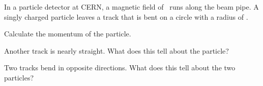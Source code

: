 In a particle detector at CERN, a magnetic field of \BO\ runs along the beam pipe. A singly charged particle leaves a track that is bent on a circle with a radius of \rO.

\begin{abcliste}
\abc Calculate the momentum of the particle.

\abc Another track is nearly straight. What does this tell about the particle?

\abc Two tracks bend in opposite directions. What does this tell about the two particles?
\end{abcliste}
